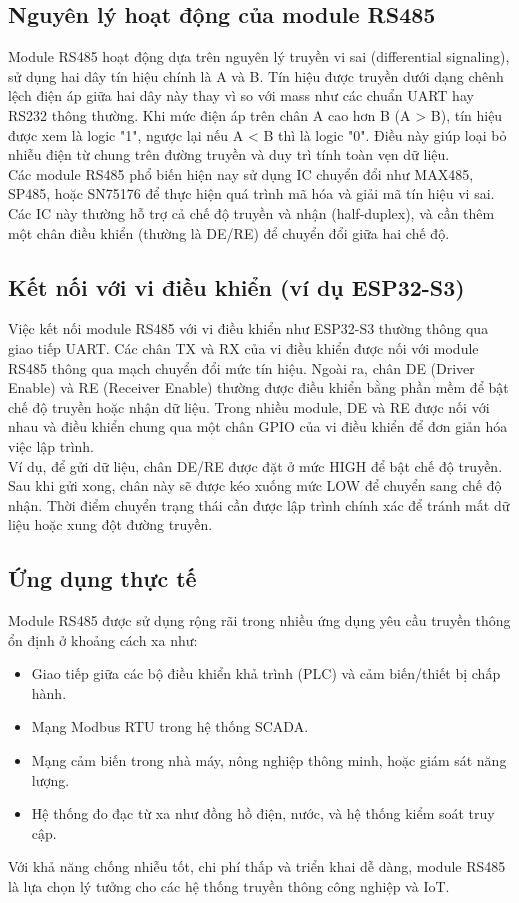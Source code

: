 \subsection{Nguyên lý hoạt động của module RS485} 
\tab Module RS485 hoạt động dựa trên nguyên lý truyền vi sai (differential signaling), sử dụng hai dây tín hiệu chính là A và B. Tín hiệu được truyền dưới dạng chênh lệch điện áp giữa hai dây này thay vì so với mass như các chuẩn UART hay RS232 thông thường. Khi mức điện áp trên chân A cao hơn B (A > B), tín hiệu được xem là logic "1", ngược lại nếu A < B thì là logic "0". Điều này giúp loại bỏ nhiễu điện từ chung trên đường truyền và duy trì tính toàn vẹn dữ liệu.\\
\tab Các module RS485 phổ biến hiện nay sử dụng IC chuyển đổi như MAX485, SP485, hoặc SN75176 để thực hiện quá trình mã hóa và giải mã tín hiệu vi sai. Các IC này thường hỗ trợ cả chế độ truyền và nhận (half-duplex), và cần thêm một chân điều khiển (thường là DE/RE) để chuyển đổi giữa hai chế độ.

\subsection{Kết nối với vi điều khiển (ví dụ ESP32-S3)} 
\tab Việc kết nối module RS485 với vi điều khiển như ESP32-S3 thường thông qua giao tiếp UART. Các chân TX và RX của vi điều khiển được nối với module RS485 thông qua mạch chuyển đổi mức tín hiệu. Ngoài ra, chân DE (Driver Enable) và RE (Receiver Enable) thường được điều khiển bằng phần mềm để bật chế độ truyền hoặc nhận dữ liệu. Trong nhiều module, DE và RE được nối với nhau và điều khiển chung qua một chân GPIO của vi điều khiển để đơn giản hóa việc lập trình.\\
\tab Ví dụ, để gửi dữ liệu, chân DE/RE được đặt ở mức HIGH để bật chế độ truyền. Sau khi gửi xong, chân này sẽ được kéo xuống mức LOW để chuyển sang chế độ nhận. Thời điểm chuyển trạng thái cần được lập trình chính xác để tránh mất dữ liệu hoặc xung đột đường truyền.

\subsection{Ứng dụng thực tế} 
\tab Module RS485 được sử dụng rộng rãi trong nhiều ứng dụng yêu cầu truyền thông ổn định ở khoảng cách xa như: 
\begin{itemize} 
  \item Giao tiếp giữa các bộ điều khiển khả trình (PLC) và cảm biến/thiết bị chấp hành. 
  \item Mạng Modbus RTU trong hệ thống SCADA. 
  \item Mạng cảm biến trong nhà máy, nông nghiệp thông minh, hoặc giám sát năng lượng. 
  \item Hệ thống đo đạc từ xa như đồng hồ điện, nước, và hệ thống kiểm soát truy cập. 
\end{itemize} 
\tab Với khả năng chống nhiễu tốt, chi phí thấp và triển khai dễ dàng, module RS485 là lựa chọn lý tưởng cho các hệ thống truyền thông công nghiệp và IoT.

